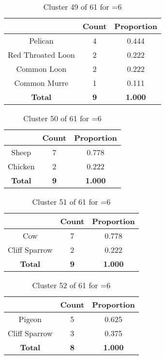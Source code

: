 \begin{table}[ht!]
\centering
\begin{tabular}{|c|c|c|}
\hline
\bf \Spec{} &\bf Count &\bf Proportion\\ \hline \hline
Pelican & 4 & 0.444\\ \hline
Red Throated Loon & 2 & 0.222\\ \hline
Common Loon & 2 & 0.222\\ \hline
Common Murre & 1 & 0.111\\ \hline
\hline
\bf Total & \bf 9 & \bf 1.000\\ \hline
\end{tabular}
\label{tab:cluster:49:6}
\caption{Cluster 49 of 61 for \minneigh{}=6}
\end{table}

\clearpage
\begin{table}[ht!]
\centering
\begin{tabular}{|c|c|c|}
\hline
\bf \Spec{} &\bf Count &\bf Proportion\\ \hline \hline
Sheep & 7 & 0.778\\ \hline
Chicken & 2 & 0.222\\ \hline
\hline
\bf Total & \bf 9 & \bf 1.000\\ \hline
\end{tabular}
\label{tab:cluster:50:6}
\caption{Cluster 50 of 61 for \minneigh{}=6}
\end{table}

\begin{table}[ht!]
\centering
\begin{tabular}{|c|c|c|}
\hline
\bf \Spec{} &\bf Count &\bf Proportion\\ \hline \hline
Cow & 7 & 0.778\\ \hline
Cliff Sparrow & 2 & 0.222\\ \hline
\hline
\bf Total & \bf 9 & \bf 1.000\\ \hline
\end{tabular}
\label{tab:cluster:51:6}
\caption{Cluster 51 of 61 for \minneigh{}=6}
\end{table}

\begin{table}[ht!]
\centering
\begin{tabular}{|c|c|c|}
\hline
\bf \Spec{} &\bf Count &\bf Proportion\\ \hline \hline
Pigeon & 5 & 0.625\\ \hline
Cliff Sparrow & 3 & 0.375\\ \hline
\hline
\bf Total & \bf 8 & \bf 1.000\\ \hline
\end{tabular}
\label{tab:cluster:52:6}
\caption{Cluster 52 of 61 for \minneigh{}=6}
\end{table}

